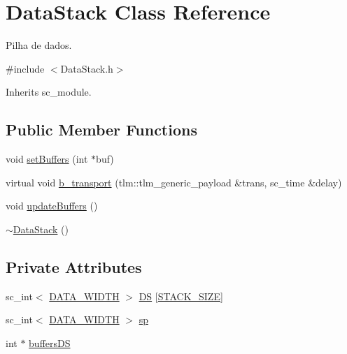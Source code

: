 \hypertarget{classDataStack}{\section{Data\+Stack Class Reference}
\label{classDataStack}
}


Pilha de dados.  




{\ttfamily \#include $<$Data\+Stack.\+h$>$}



Inherits sc\+\_\+module.

\subsection*{Public Member Functions}
\begin{DoxyCompactItemize}
\item 
void \hyperlink{classDataStack_ae3f20d836af764c35b2f607084ce1ba3}{set\+Buffers} (int $\ast$buf)
\item 
virtual void \hyperlink{classDataStack_aa3b9a31c5da46278b9edcdb83419c902}{b\+\_\+transport} (tlm\+::tlm\+\_\+generic\+\_\+payload \&trans, sc\+\_\+time \&delay)
\item 
void \hyperlink{classDataStack_aa7b6cf353611b91d8c8822b2eecc4270}{update\+Buffers} ()
\item 
\hyperlink{classDataStack_a3521eabae3f1c0033b6eb26578e67b5d}{$\sim$\+Data\+Stack} ()
\end{DoxyCompactItemize}
\subsection*{Private Attributes}
\begin{DoxyCompactItemize}
\item 
sc\+\_\+int$<$ \hyperlink{Defines_8h_af087b76f9707be9d3b43ba0c782c31c3}{D\+A\+T\+A\+\_\+\+W\+I\+D\+T\+H} $>$ \hyperlink{classDataStack_a8c2615faec0463346e10a5f067757490}{D\+S} \mbox{[}\hyperlink{Defines_8h_a6423a880df59733d2d9b509c7718d3a9}{S\+T\+A\+C\+K\+\_\+\+S\+I\+Z\+E}\mbox{]}
\item 
sc\+\_\+int$<$ \hyperlink{Defines_8h_af087b76f9707be9d3b43ba0c782c31c3}{D\+A\+T\+A\+\_\+\+W\+I\+D\+T\+H} $>$ \hyperlink{classDataStack_ab3b029f3fe7bae405c3be8a024f393b0}{sp}
\item 
int $\ast$ \hyperlink{classDataStack_a6d48a919de4d74bbc6746323647eb797}{buffers\+D\+S}
\end{DoxyCompactItemize}


